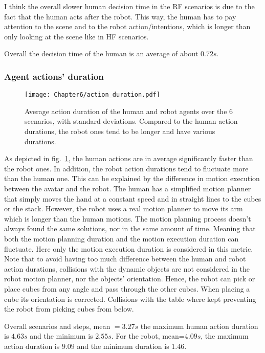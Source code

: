 I think the overall slower human decision time in the RF scenarios is due to the fact that the human acts after the robot. This way, the human has to pay attention to the scene and to the robot action/intentions, which is longer than only looking at the scene like in HF scenarios.   

Overall the decision time of the human is an average of about $0.72s$.


\subsubsection*{Agent actions' duration}

\begin{figure}[h]
    \center
    \texttt{[image: Chapter6/action\_duration.pdf]}
    \caption{Average action duration of the human and robot agents over the 6 scenarios, with standard deviations. Compared to the human action durations, the robot ones tend to be longer and have various durations.}
    \label{fig:action_durations}
\end{figure}

As depicted in fig.~\ref{fig:action_durations}, the human actions are in average significantly faster than the robot ones. In addition, the robot action durations tend to fluctuate more than the human one. This can be explained by the difference in motion execution between the avatar and the robot. The human has a simplified motion planner that simply moves the hand at a constant speed and in straight lines to the cubes or the stack. However, the robot uses a real motion planner to move its arm which is longer than the human motions. The motion planning process doesn't always found the same solutions, nor in the same amount of time. Meaning that both the motion planning duration and the motion execution duration can fluctuate. Here only the motion execution duration is considered in this metric. Note that to avoid having too much difference between the human and robot action durations, collisions with the dynamic objects are not considered in the robot motion planner, nor the objects' orientation. Hence, the robot can pick or place cubes from any angle and pass through the other cubes. When placing a cube its orientation is corrected. Collisions with the table where kept preventing the robot from picking cubes from below.  

Overall scenarios and steps, mean $=3.27s$ the maximum human action duration is $4.63s$ and the minimum is $2.55s$. For the robot, mean=$4.09s$, the maximum action duration is $9.09$ and the minimum duration is $1.46$.

